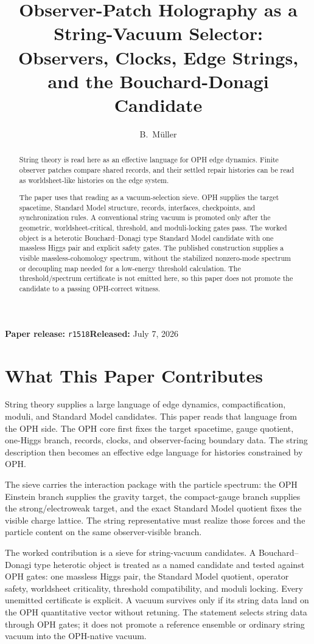 \documentclass[11pt]{article}
\title{Observer-Patch Holography as a String-Vacuum Selector:\\
Observers, Clocks, Edge Strings, and the Bouchard-Donagi Candidate}
\author{B.\ M\"uller}
\date{\OPHPaperReleaseDate}
\newcommand{\OPHPaperReleaseID}{r1518}%
\newcommand{\OPHPaperReleaseDate}{July 7, 2026}%
\newcommand{\OPHPaperReleaseBanner}{%
        \begin{center}
        \small\textbf{Paper release:} \texttt{\OPHPaperReleaseID}\quad\textbf{Released:} \OPHPaperReleaseDate
        \end{center}}
\theoremstyle{remark}
\theoremstyle{plain}
\begin{document}
\maketitle
\OPHPaperReleaseBanner

\begin{abstract}
String theory is read here as an effective language for OPH edge dynamics. Finite observer patches compare shared records, and their settled repair histories can be read as worldsheet-like histories on the edge system.

The paper uses that reading as a vacuum-selection sieve. OPH supplies the target spacetime, Standard Model structure, records, interfaces, checkpoints, and synchronization rules. A conventional string vacuum is promoted only after the geometric, worldsheet-critical, threshold, and moduli-locking gates pass. The worked object is a heterotic Bouchard--Donagi type Standard Model candidate with one massless Higgs pair and explicit safety gates. The published construction supplies a visible massless-cohomology spectrum, without the stabilized nonzero-mode spectrum or decoupling map needed for a low-energy threshold calculation. The threshold/spectrum certificate is not emitted here, so this paper does not promote the candidate to a passing OPH-correct witness.
\end{abstract}

\section*{What This Paper Contributes}

String theory supplies a large language of edge dynamics, compactification,
moduli, and Standard Model candidates. This paper reads that language from the
OPH side. The OPH core first fixes the target spacetime, gauge quotient,
one-Higgs branch, records, clocks, and observer-facing boundary data. The
string description then becomes an effective edge language for histories
constrained by OPH.

The sieve carries the interaction package with the particle spectrum:
the OPH Einstein branch supplies the gravity target, the compact-gauge branch supplies the
strong/electroweak target, and the exact Standard Model quotient fixes the visible charge lattice.
The string representative must realize those forces and the particle content on the same
observer-visible branch.

The worked contribution is a sieve for string-vacuum candidates. A
Bouchard--Donagi type heterotic object is treated as a named candidate and
tested against OPH gates: one massless Higgs pair, the Standard Model quotient,
operator safety, worldsheet criticality, threshold compatibility, and moduli locking. Every
unemitted certificate is explicit. A vacuum survives only if its string data land on the OPH
quantitative vector without retuning. The statement selects string data through OPH gates; it
does not promote a reference ensemble or ordinary string vacuum into the OPH-native vacuum.
\end{document}

